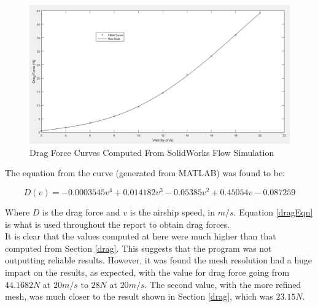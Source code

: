 \documentclass[../main.tex]{subfiles}
\begin{document}
\begin{figure}[H]
	\centering
	\includegraphics[width=\linewidth]{img/drag/curveFit.PNG}
	\caption{Drag Force Curves Computed From SolidWorks Flow Simulation}
	\label{fig:curveFit}
\end{figure}

The equation from the curve (generated from MATLAB) was found to be:

\begin{equation} \label{dragEqn}
	D(v) = -0.0003545v^4 + 0.014182v^3 -0.05385v^2 + 0.45054v -0.087259
\end{equation}

Where $ D $ is the drag force and $ v $ is the airship speed, in $m/s$. Equation \ref{dragEqn} is what is used throughout the report to obtain drag forces.\\

It is clear that the values computed at here were much higher than that computed from Section \ref{drag}. This suggests that the program was not outputting reliable results. However, it was found the mesh resolution had a huge impact on the results, as expected, with the value for drag force going from $ 44.1682N $ at $ 20m/s $ to $ 28N $ at $ 20m/s $. The second value, with the more refined mesh, was much closer to the result shown in Section \ref{drag}, which was $23.15N$.
\end{document}
